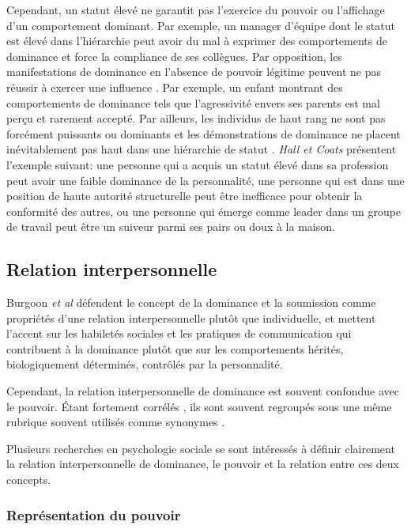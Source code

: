 	Cependant, un statut élevé ne garantit pas l'exercice du pouvoir ou l'affichage d'un comportement dominant. Par exemple, un manager d'équipe dont le statut est élevé dans l'hiérarchie peut avoir du mal à exprimer des comportements de dominance et force la compliance de ses collègues. Par opposition, les manifestations de dominance en l'absence de pouvoir légitime peuvent ne pas réussir à exercer une influence \cite{ridgeway1995legitimacy}. Par exemple, un enfant montrant des comportements de dominance tels que l'agressivité envers ses parents est mal perçu et rarement accepté.
	Par ailleurs, les individus de haut rang ne sont pas forcément puissants ou dominants et les démonstrations de dominance ne placent inévitablement pas haut dans une hiérarchie de statut \cite{burgoonnonverbal}. \emph{Hall et Coats} \cite{hall2005nonverbal} présentent l'exemple suivant: une personne qui a acquis un statut élevé dans sa profession peut avoir une faible dominance de la personnalité, une personne qui est dans une position de haute autorité structurelle peut être inefficace pour obtenir la conformité des autres, ou une personne qui émerge comme leader dans un groupe de travail peut être un suiveur parmi ses pairs ou doux à la maison.
	
	\subsection{Relation interpersonnelle}
		Burgoon \emph{et al} \cite{burgoon1998nature} défendent le concept de la dominance et la soumission comme propriétés d'une relation interpersonnelle plutôt que individuelle, et mettent l'accent sur les habiletés sociales et les pratiques de communication qui contribuent à la dominance plutôt que sur les comportements hérités, biologiquement déterminés, contrôlés par la personnalité.
		
		Cependant, la relation interpersonnelle de dominance est souvent confondue avec le pouvoir. Étant fortement corrélés \cite{dunbar2005perceptions}, ils sont souvent regroupés sous une même rubrique souvent utilisés comme synonymes  \cite{ellyson1985power,burgoon1998nature}.
		
		Plusieurs recherches en psychologie sociale \cite{burgoon1998nature,dunbar2005perceptions,burgoon2006nonverbal} se sont intéressés à définir clairement la relation interpersonnelle de dominance, le pouvoir et la relation entre ces deux concepts. 
		
		\subsubsection{Représentation du pouvoir}
		
